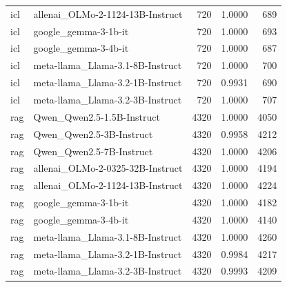 \begin{tabular}{llrrr}
icl & allenai_OLMo-2-1124-13B-Instruct & 720 & 1.0000 & 689 \\
icl & google_gemma-3-1b-it & 720 & 1.0000 & 693 \\
icl & google_gemma-3-4b-it & 720 & 1.0000 & 687 \\
icl & meta-llama_Llama-3.1-8B-Instruct & 720 & 1.0000 & 700 \\
icl & meta-llama_Llama-3.2-1B-Instruct & 720 & 0.9931 & 690 \\
icl & meta-llama_Llama-3.2-3B-Instruct & 720 & 1.0000 & 707 \\
rag & Qwen_Qwen2.5-1.5B-Instruct & 4320 & 1.0000 & 4050 \\
rag & Qwen_Qwen2.5-3B-Instruct & 4320 & 0.9958 & 4212 \\
rag & Qwen_Qwen2.5-7B-Instruct & 4320 & 1.0000 & 4206 \\
rag & allenai_OLMo-2-0325-32B-Instruct & 4320 & 1.0000 & 4194 \\
rag & allenai_OLMo-2-1124-13B-Instruct & 4320 & 1.0000 & 4224 \\
rag & google_gemma-3-1b-it & 4320 & 1.0000 & 4182 \\
rag & google_gemma-3-4b-it & 4320 & 1.0000 & 4140 \\
rag & meta-llama_Llama-3.1-8B-Instruct & 4320 & 1.0000 & 4260 \\
rag & meta-llama_Llama-3.2-1B-Instruct & 4320 & 0.9984 & 4217 \\
rag & meta-llama_Llama-3.2-3B-Instruct & 4320 & 0.9993 & 4209 \\
\bottomrule
\end{tabular}
